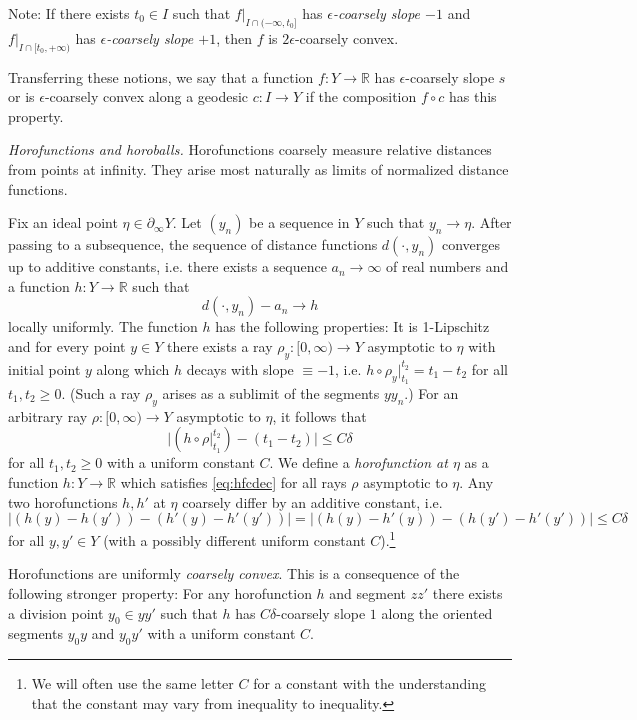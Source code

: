 \documentclass[12pt]{article}
\theoremstyle{boldplain}
\theoremstyle{bolddefinition}
\numberwithin{equation}{section}
\def\R{{\mathbb R}}
\def\de{\delta}
\def\eps{\epsilon}
\def\geo{\partial_{\infty}}
\begin{document}
Note: 
If there exists $t_0\in I$ such that $f|_{I\cap(-\infty,t_0]}$ has {\em $\eps$-coarsely slope $-1$ } 
and $f|_{I\cap[t_0,+\infty)}$ has {\em $\eps$-coarsely slope $+1$},
then $f$ is $2\eps$-coarsely convex. 

Transferring these notions,
we say that a function $f:Y\to\R$ has $\eps$-coarsely slope $s$ or is $\eps$-coarsely convex
along a geodesic $c:I\to Y$ 
if the composition $f\circ c$ has this property.



\medskip 
{\em Horofunctions and horoballs.}
Horofunctions coarsely measure relative distances from points at infinity.
They arise most naturally as limits of normalized distance functions.

Fix an ideal point $\eta\in\geo Y$.
Let $(y_n)$ be a sequence in $Y$ such that $y_n\to\eta$.
After passing to a subsequence, the sequence of distance functions $d(\cdot,y_n)$ converges up to additive constants,
i.e. there exists a sequence $a_n\to\infty$ of real numbers and a function $h:Y\to\R$ such that 
$$ d(\cdot,y_n)-a_n \to h $$
locally uniformly.
The function $h$ has the following properties:
It is 1-Lipschitz and for every point $y\in Y$ there exists a ray $\rho_y:[0,\infty)\to Y$ asymptotic to $\eta$ with initial point $y$
along which $h$ decays with slope $\equiv-1$,
i.e. $h\circ\rho_y|_{t_1}^{t_2}=t_1-t_2$ for all $t_1,t_2\geq0$. 
(Such a ray $\rho_y$ arises as a sublimit of the segments $yy_n$.)
For an arbitrary ray $\rho:[0,\infty)\to Y$ asymptotic to $\eta$,
it follows that 
\begin{equation}
\label{eq:hfcdec}
\bigl|(h\circ\rho|_{t_1}^{t_2})-(t_1-t_2)\bigr|\leq C\de
\end{equation} 
for all $t_1,t_2\geq0$ with a uniform constant $C$. 
We define a {\em horofunction at $\eta$}
as a function $h:Y\to\R$ which satisfies \eqref{eq:hfcdec} for all rays $\rho$ asymptotic to $\eta$.
Any two horofunctions $h,h'$ at $\eta$ coarsely differ by an additive constant,
i.e. 
\begin{equation}
\label{eq:hfceq}
|(h(y)-h(y'))-(h'(y)-h'(y'))| = |(h(y)-h'(y))-(h(y')-h'(y'))| 
\leq C\de
\end{equation} 
for all $y,y'\in Y$ (with a possibly different uniform constant $C$).\footnote{We will often use the same letter $C$ for a constant 
with the understanding that the constant may vary from inequality to inequality.}

Horofunctions are uniformly {\em coarsely convex}.
This is a consequence of the following stronger property:
For any horofunction $h$ and segment $zz'$ there 
exists a division point $y_0\in yy'$ such that $h$ has $C\de$-coarsely slope $1$ along the oriented segments $y_0y$ and $y_0y'$
with a uniform constant $C$.
\end{document}
